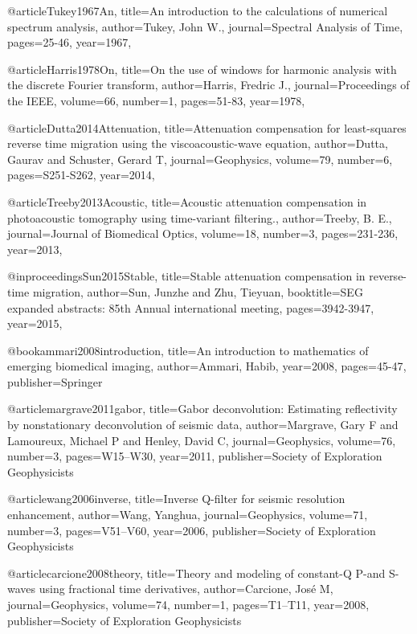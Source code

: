 @article{Tukey1967An,
  title={An introduction to the calculations of numerical spectrum analysis},
  author={Tukey, John W.},
  journal={Spectral Analysis of Time},
  pages={25-46},
  year={1967},
}

@article{Harris1978On,
  title={On the use of windows for harmonic analysis with the discrete {F}ourier transform},
  author={Harris, Fredric J.},
  journal={Proceedings of the IEEE},
  volume={66},
  number={1},
  pages={51-83},
  year={1978},
}

@article{Dutta2014Attenuation,
  title={Attenuation compensation for least-squares reverse time migration using the viscoacoustic-wave equation},
  author={Dutta, Gaurav and Schuster, Gerard T},
  journal={Geophysics},
  volume={79},
  number={6},
  pages={S251-S262},
  year={2014},
}

@article{Treeby2013Acoustic,
  title={Acoustic attenuation compensation in photoacoustic tomography using time-variant filtering.},
  author={Treeby, B. E.},
  journal={Journal of Biomedical Optics},
  volume={18},
  number={3},
  pages={231-236},
  year={2013},
}

@inproceedings{Sun2015Stable,
  title={Stable attenuation compensation in reverse-time migration},
  author={Sun, Junzhe and Zhu, Tieyuan},
  booktitle={SEG expanded abstracts: 85th Annual international meeting},
  pages={3942-3947},
  year={2015},
}

@book{ammari2008introduction,
  title={An introduction to mathematics of emerging biomedical imaging},
  author={Ammari, Habib},
  year={2008},
  pages={45-47},
  publisher={Springer}
}


@article{margrave2011gabor,
  title={Gabor deconvolution: Estimating reflectivity by nonstationary deconvolution of seismic data},
  author={Margrave, Gary F and Lamoureux, Michael P and Henley, David C},
  journal={Geophysics},
  volume={76},
  number={3},
  pages={W15--W30},
  year={2011},
  publisher={Society of Exploration Geophysicists}
}

@article{wang2006inverse,
  title={Inverse {Q}-filter for seismic resolution enhancement},
  author={Wang, Yanghua},
  journal={Geophysics},
  volume={71},
  number={3},
  pages={V51--V60},
  year={2006},
  publisher={Society of Exploration Geophysicists}
}

@article{carcione2008theory,
  title={Theory and modeling of constant-{Q} {P}-and {S}-waves using fractional time derivatives},
  author={Carcione, Jos{\'e} M},
  journal={Geophysics},
  volume={74},
  number={1},
  pages={T1--T11},
  year={2008},
  publisher={Society of Exploration Geophysicists}
}


